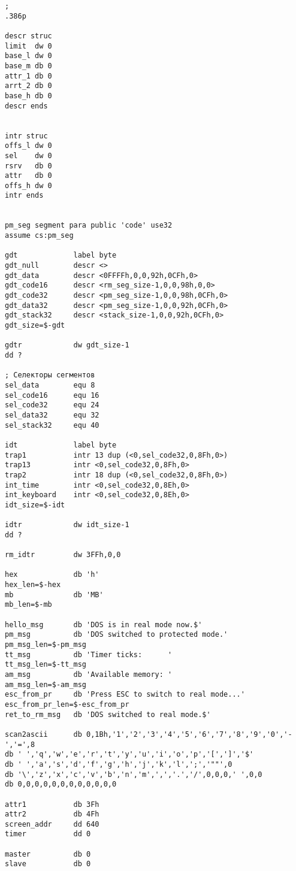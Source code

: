 \documentclass[12pt]{report}
\begin{document}
\begin{verbatim}
;
.386p

descr struc
limit  dw 0
base_l dw 0
base_m db 0
attr_1 db 0
arrt_2 db 0
base_h db 0
descr ends


intr struc
offs_l dw 0
sel    dw 0
rsrv   db 0
attr   db 0
offs_h dw 0
intr ends


pm_seg segment para public 'code' use32
assume cs:pm_seg

gdt             label byte
gdt_null        descr <>
gdt_data        descr <0FFFFh,0,0,92h,0CFh,0>
gdt_code16      descr <rm_seg_size-1,0,0,98h,0,0>
gdt_code32      descr <pm_seg_size-1,0,0,98h,0CFh,0>
gdt_data32      descr <pm_seg_size-1,0,0,92h,0CFh,0>
gdt_stack32     descr <stack_size-1,0,0,92h,0CFh,0>
gdt_size=$-gdt

gdtr            dw gdt_size-1
dd ?

; Селекторы сегментов
sel_data        equ 8
sel_code16      equ 16
sel_code32      equ 24
sel_data32      equ 32
sel_stack32     equ 40

idt             label byte
trap1           intr 13 dup (<0,sel_code32,0,8Fh,0>)
trap13          intr <0,sel_code32,0,8Fh,0>
trap2           intr 18 dup (<0,sel_code32,0,8Fh,0>)
int_time        intr <0,sel_code32,0,8Eh,0>
int_keyboard    intr <0,sel_code32,0,8Eh,0>
idt_size=$-idt

idtr            dw idt_size-1
dd ?

rm_idtr         dw 3FFh,0,0

hex             db 'h'
hex_len=$-hex
mb              db 'MB'
mb_len=$-mb

hello_msg       db 'DOS is in real mode now.$'
pm_msg          db 'DOS switched to protected mode.'
pm_msg_len=$-pm_msg
tt_msg          db 'Timer ticks:      '
tt_msg_len=$-tt_msg
am_msg          db 'Available memory: '
am_msg_len=$-am_msg
esc_from_pr     db 'Press ESC to switch to real mode...'
esc_from_pr_len=$-esc_from_pr
ret_to_rm_msg   db 'DOS switched to real mode.$'

scan2ascii      db 0,1Bh,'1','2','3','4','5','6','7','8','9','0','-','=',8
db ' ','q','w','e','r','t','y','u','i','o','p','[',']','$'
db ' ','a','s','d','f','g','h','j','k','l',';','""',0
db '\','z','x','c','v','b','n','m',',','.','/',0,0,0,' ',0,0
db 0,0,0,0,0,0,0,0,0,0,0,0

attr1           db 3Fh
attr2           db 4Fh
screen_addr     dd 640
timer           dd 0

master          db 0
slave           db 0


\end{verbatim}
\end{document}
